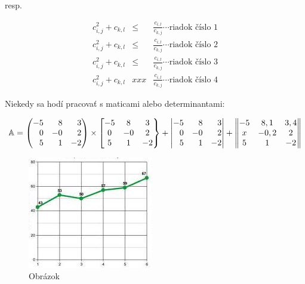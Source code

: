 resp.

\begin{eqnarray}
\label{xx01}
c_{i,j}^2+c_{k,l} &\le& \frac{c_{i,l}}{c_{k,j}} \cdots \mbox{riadok číslo 1} \\
\label{xx02}
c_{i,j}^2+c_{k,l} &\le& \frac{c_{i,l}}{c_{k,j}} \cdots \mbox{riadok číslo 2} \\
\label{xx03}\nonumber
c_{i,j}^2+c_{k,l} &\le& \frac{c_{i,l}}{c_{k,j}} \cdots \mbox{riadok číslo 3} \\
\label{xx04}
c_{i,j}^2+c_{k,l} &xxx& \frac{c_{i,l}}{c_{k,j}} \cdots \mbox{riadok číslo 4}
\end{eqnarray}



\noindent
Niekedy sa hodí pracovať s maticami alebo determinantami:

$$
{\mathbb A} =
\left( \begin{array}{@{}*{3}{r}@{}}
-5 &  8 &  3\\
 0 & -0 &  2\\
 5 &  1 & -2
\end{array} \right)
%
\times
%
\left[ \begin{array}{@{}*{3}{c}@{}}
-5 &  8 &  3\\
 0 & -0 &  2\\
 5 &  1 & -2
\end{array} \right\}
%
+
%
\left| \begin{array}{@{}*{3}{r}@{}}
-5 &  8 &  3\\
 0 & -0 &  2\\
 5 &  1 & -2
\end{array} \right\vert
%
+
%
\left\Vert\begin{array}{@{}*{3}{c}@{}}
-5 & 8,1  & 3,4 \\
x  & -0,2 & 2   \\
5  & 1    & -2
\end{array} \right\Vert
$$

\begin{figure}[ht]
\begin{center}
\includegraphics[width=.4\textwidth]{obrazok.jpg}
\caption{Obrázok}
\label{obr2}
\end{center}
\end{figure}

